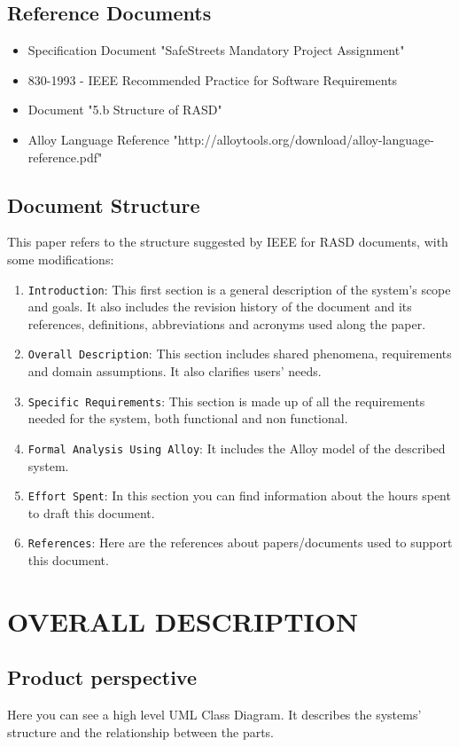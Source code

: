 \documentclass[12pt,a4paper]{article}
\begin{document}
\subsection{Reference Documents} 
\begin{itemize}
				\item Specification Document "SafeStreets Mandatory Project Assignment"
				\item 830-1993 - IEEE Recommended Practice for Software Requirements
				\item Document "5.b Structure of RASD"
				\item Alloy Language Reference "http://alloytools.org/download/alloy-language-reference.pdf"
			\end{itemize}
\subsection{Document Structure} 
	This paper refers to the structure suggested by IEEE for RASD documents, with some modifications:
		\begin{enumerate}
			\item \texttt{Introduction}: This first section is a general description of the system's scope and goals. It also includes the revision history of the document and its references, definitions, abbreviations and acronyms used along the paper.
			\item \texttt{Overall Description}: This section includes shared phenomena, requirements and domain assumptions. It also clarifies users' needs.
			\item \texttt{Specific Requirements}: This section is made up of all the requirements needed for the system, both functional and non functional.
			\item \texttt{Formal Analysis Using Alloy}: It includes the Alloy model of the described system.
			\item \texttt{Effort Spent}: In this section you can find information about the hours spent to draft this document.
			\item \texttt{References}: Here are the references about papers/documents used to support this document.
		\end{enumerate}

\newpage
\section{OVERALL DESCRIPTION}
\subsection{Product perspective}
Here you can see a high level UML Class Diagram. It describes the systems' structure and the relationship between the parts.
\end{document}
